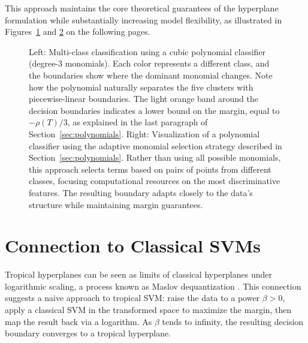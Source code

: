 \documentclass{article}
\begin{document}
This approach maintains the core theoretical guarantees of the hyperplane formulation while substantially increasing model flexibility, as illustrated in Figures~\ref{fig:homogeneous_selection} and \ref{fig:adaptive_polynomial} on the following pages.



\vspace*{3em}
\begin{figure}[ht!]
    \centering
    \begin{subfigure}[t]{0.48\textwidth}
        \centering
        \resizebox{\textwidth}{!}{\clipbox{0.15\width{} 0.30\height{} 0.15\width{} 0.30\height{}}{}}
        \caption{}
        \label{fig:homogeneous_selection}
    \end{subfigure}\hfill
    \begin{subfigure}[t]{0.48\textwidth}
        \centering
        \resizebox{\textwidth}{!}{\clipbox{0.15\width{} 0.30\height{} 0.15\width{} 0.30\height{}}{}}
        \caption{}
        \label{fig:adaptive_polynomial}
    \end{subfigure}
    \caption{Left: Multi-class classification using a cubic polynomial classifier (degree-3 monomials). Each color represents a different class, and the boundaries show where the dominant monomial changes. Note how the polynomial naturally separates the five clusters with piecewise-linear boundaries. The light orange band around the decision boundaries indicates a lower bound on the margin, equal to $-\rho(T)/3$, as explained in the last paragraph of Section~\ref{sec:polynomials}. Right: Visualization of a polynomial classifier using the adaptive monomial selection strategy described in Section~\ref{sec:polynomials}. Rather than using all possible monomials, this approach selects terms based on pairs of points from different classes, focusing computational resources on the most discriminative features. The resulting boundary adapts closely to the data's structure while maintaining margin guarantees.}
    \label{fig:poly_classifier_comparison}
\end{figure}
\vspace*{3em}


\newpage
\section{Connection to Classical SVMs}\label{sec:maslov}
Tropical hyperplanes can be seen as limits of classical hyperplanes under logarithmic scaling, a process known as Maslov dequantization \cite{viro2001}. This connection suggests a naive approach to tropical SVM: raise the data to a power $\beta > 0$, apply a classical SVM in the transformed space to maximize the margin, then map the result back via a logarithm. As $\beta$ tends to infinity, the resulting decision boundary converges to a tropical hyperplane.
\end{document}
